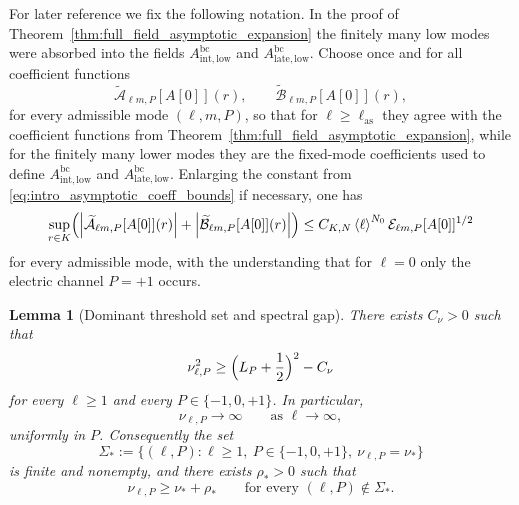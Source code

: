\documentclass[12pt]{article}
\numberwithin{equation}{section}
\theoremstyle{plain}
\newtheorem{lemma}[theorem]{Lemma}
\theoremstyle{definition}
\theoremstyle{remark}
\newcommand{\bc}{\mathrm{bc}}
\newcommand{\angles}[1]{\left\langle #1 \right\rangle}
\newcommand{\abs}[1]{\left|#1\right|}
\begin{document}
For later reference we fix the following notation.  In the proof of Theorem~\ref{thm:full_field_asymptotic_expansion} the finitely many low modes were absorbed into the fields $A^{\bc}_{\mathrm{int,low}}$ and $A^{\bc}_{\mathrm{late,low}}$.  Choose once and for all coefficient functions
\[
   \widetilde{\mathcal A}_{\ell m,P}[A[0]](r),
   \qquad
   \widetilde{\mathcal B}_{\ell m,P}[A[0]](r),
\]
for every admissible mode $(\ell,m,P)$, so that for $\ell\ge\ell_{\mathrm{as}}$ they agree with the coefficient functions from Theorem~\ref{thm:full_field_asymptotic_expansion}, while for the finitely many lower modes they are the fixed-mode coefficients used to define $A^{\bc}_{\mathrm{int,low}}$ and $A^{\bc}_{\mathrm{late,low}}$.  Enlarging the constant from \eqref{eq:intro_asymptotic_coeff_bounds} if necessary, one has
\begin{equation}\label{eq:full_modal_coeff_bound_all}
   \sup_{r\in K}
   \Bigl(
      \abs{\widetilde{\mathcal A}_{\ell m,P}[A[0]](r)}
      +
      \abs{\widetilde{\mathcal B}_{\ell m,P}[A[0]](r)}
   \Bigr)
   \le
   C_{K,N}\angles{\ell}^{N_0}\mathcal E_{\ell m,P}[A[0]]^{1/2}
\end{equation}
for every admissible mode, with the understanding that for $\ell=0$ only the electric channel $P=+1$ occurs.

\begin{lemma}[Dominant threshold set and spectral gap]\label{lem:dominant_threshold_gap}
There exists $C_\nu>0$ such that
\[
   \nu_{\ell,P}^2
   \ge
   \Bigl(L_P+\frac12\Bigr)^2-C_\nu
\]
for every $\ell\ge1$ and every $P\in\{-1,0,+1\}$.  In particular,
\[
   \nu_{\ell,P}\to\infty
   \qquad\text{as }\ell\to\infty,
\]
uniformly in $P$.  Consequently the set
\[
   \Sigma_*:=\{(\ell,P):\ell\ge1,\ P\in\{-1,0,+1\},\ \nu_{\ell,P}=\nu_*\}
\]
is finite and nonempty, and there exists $\rho_*>0$ such that
\[
   \nu_{\ell,P}\ge\nu_*+\rho_*
   \qquad\text{for every }(\ell,P)\notin\Sigma_*.
\]
\end{lemma}
\end{document}
